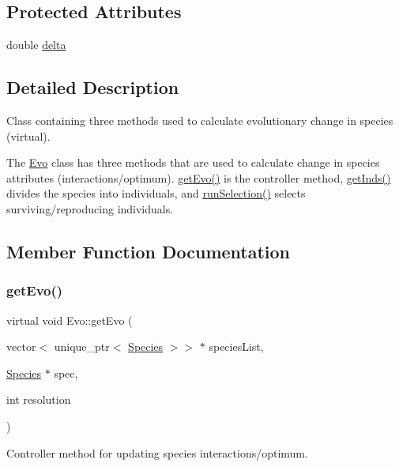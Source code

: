 \subsection*{Protected Attributes}
\begin{DoxyCompactItemize}
\item 
double \hyperlink{classEvo_a8f02598dfb1249ad135fbc741c27e0e0}{delta}
\end{DoxyCompactItemize}


\subsection{Detailed Description}
Class containing three methods used to calculate evolutionary change in species (virtual). 

The \hyperlink{classEvo}{Evo} class has three methods that are used to calculate change in species attributes (interactions/optimum). \hyperlink{classEvo_a8c5208c00d1ee2fe9bef41bdd7fe0ab7}{get\+Evo()} is the controller method, \hyperlink{classEvo_a88b5e0b1053cf1b4b473a08e2f03db92}{get\+Inds()} divides the species into individuals, and \hyperlink{classEvo_a10ff4eefe3967ff5cf5f820890c18079}{run\+Selection()} selects surviving/reproducing individuals. 

\subsection{Member Function Documentation}
\mbox{\label{classEvo_a8c5208c00d1ee2fe9bef41bdd7fe0ab7}} 
\subsubsection{\texorpdfstring{get\+Evo()}{getEvo()}}
{\footnotesize\ttfamily virtual void Evo\+::get\+Evo (\begin{DoxyParamCaption}\item[{vector$<$ unique\+\_\+ptr$<$ \hyperlink{classSpecies}{Species} $>$$>$ $\ast$}]{species\+List,  }\item[{\hyperlink{classSpecies}{Species} $\ast$}]{spec,  }\item[{int}]{resolution }\end{DoxyParamCaption})\hspace{0.3cm}{\ttfamily [pure virtual]}}



Controller method for updating species interactions/optimum. 

